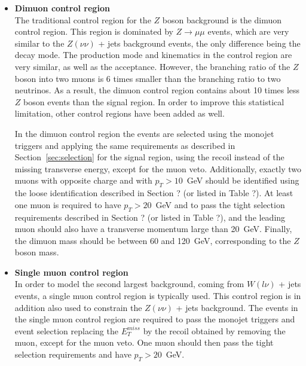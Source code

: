 \begin{itemize}
 \item[] \textbf{Dimuon control region}\\ The traditional control region for the $Z$ boson background is the dimuon control region. This region is dominated by $Z\rightarrow\mu\mu$ events, which are very similar to the $Z(\nu\nu)$ + jets background events, the only difference being the decay mode. The production mode and kinematics in the control region are very similar, as well as the acceptance. However, the branching ratio of the $Z$ boson into two muons is 6 times smaller than the branching ratio to two neutrinos. As a result, the dimuon control region contains about 10 times less $Z$ boson events than the signal region. In order to improve this statistical limitation, other control regions have been added as well.

In the dimuon control region the events are selected using the monojet triggers and applying the same requirements as described in Section~\ref{sec:selection} for the signal region, using the recoil instead of the missing transverse energy, except for the muon veto. Additionally, exactly two muons with opposite charge and with $p_T > 10$~GeV should be identified using the loose identification {\color{red}described in Section ? (or listed in Table ?)}. At least one muon is required to have $p_T > 20$~GeV and to pass the tight selection requirements {\color{red}described in Section ? (or listed in Table ?)}, and the leading muon should also have a transverse momentum large than 20~GeV. Finally, the dimuon mass should be between 60 and 120~GeV, corresponding to the $Z$ boson mass.

\item[] \textbf{Single muon control region}\\ In order to model the second largest background, coming from $W(l\nu)$ + jets events, a single muon control region is typically used. This control region is in addition also used to constrain the $Z(\nu\nu)$ + jets background. The events in the single muon control region are required to pass the monojet triggers and event selection replacing the $E_T^{miss}$ by the recoil obtained by removing the muon, except for the muon veto. One muon should then pass the {\color{red} tight selection} requirements and have $p_T > 20$~GeV.


\end{itemize}
